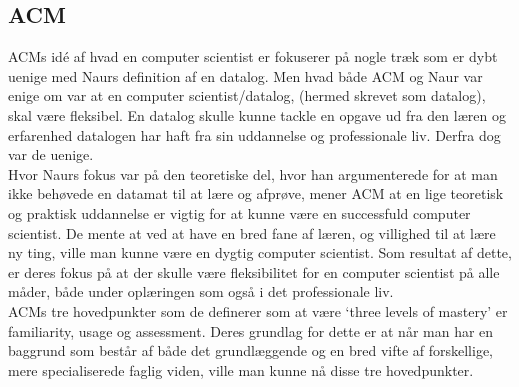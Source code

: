 \subsection{ACM}
ACMs id\'{e} af hvad en computer scientist er fokuserer på nogle træk som 
er dybt uenige med Naurs definition af en datalog. Men hvad både ACM 
og Naur var enige om var at en computer scientist/datalog, (hermed skrevet som datalog), skal være fleksibel. En datalog skulle kunne tackle en opgave 
ud fra den læren og erfarenhed datalogen har haft fra sin uddannelse og 
professionale liv. Derfra dog var de uenige.\\
Hvor Naurs fokus var på den teoretiske del, hvor han argumenterede for 
at man ikke behøvede en datamat til at lære og afprøve, mener 
ACM at en lige teoretisk og praktisk uddannelse er vigtig for at kunne 
være en successfuld computer scientist. De mente at ved at have en bred fane af læren, og villighed til at lære ny ting, ville man kunne være en dygtig 
computer scientist. Som resultat af dette, er deres fokus på at der skulle 
være fleksibilitet for en computer scientist på alle måder, både under 
oplæringen som også i det professionale liv.\\
ACMs tre hovedpunkter som de definerer som at være `three levels of 
mastery' er familiarity, usage og assessment. Deres grundlag for dette er at 
når man har en baggrund som består af både det grundlæggende og en 
bred vifte af forskellige, mere specialiserede faglig viden, ville man kunne 
nå disse tre hovedpunkter.
